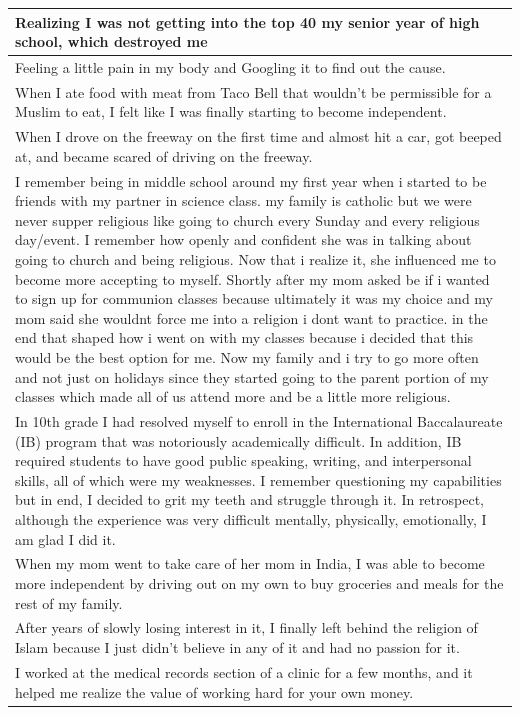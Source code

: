 \documentclass[
  .7em,
  letterpaper,
  DIV=11,
  numbers=noendperiod]{scrartcl}
\begin{document}
\begin{table}
\begin{tabular}{l}
\hline
Realizing I was not getting into the top 40 my senior year of high school, which destroyed me\\
\hline
Feeling a little pain in my body and Googling it to find out the cause.\\
\hline
When I ate food with meat from Taco Bell that wouldn't be permissible for a Muslim to eat, I felt like I was finally starting to become independent.\\
\hline
When I drove on the freeway on the first time and almost hit a car, got beeped at, and became scared of driving on the freeway.\\
\hline
I remember being in middle school around my first year when i started to be friends with my partner in science class. my family is catholic but we were never supper religious like going to church every Sunday and every religious day/event. I remember how openly and confident she was in talking about going to church and being religious. Now that i realize it, she influenced me to become more accepting to myself. Shortly after my mom asked be if i wanted to sign up for communion classes because ultimately it was my choice and my mom said she wouldnt force me into a religion i dont want to practice. in the end that shaped how i went on with my classes because i decided that this would be the best option for me. Now my family and i try to go more often and not just on holidays since they started going to the parent portion of my classes which made all of us attend more and be a little more religious.\\
\hline
In 10th grade I had resolved myself to enroll in the International Baccalaureate (IB) program that was notoriously academically difficult. In addition, IB required students to have good public speaking, writing, and interpersonal skills, all of which were my weaknesses. I remember questioning my capabilities but in end, I decided to grit my teeth and struggle through it. In retrospect, although the experience was very difficult mentally, physically, emotionally, I am glad I did it.\\
\hline
When my mom went to take care of her mom in India, I was able to become more independent by driving out on my own to buy groceries and meals for the rest of my family.\\
\hline
After years of slowly losing interest in it, I finally left behind the religion of Islam because I just didn't believe in any of it and had no passion for it.\\
\hline
I worked at the medical records section of a clinic for a few months, and it helped me realize the value of working hard for your own money.\\

\end{tabular}
\end{table}
\end{document}
